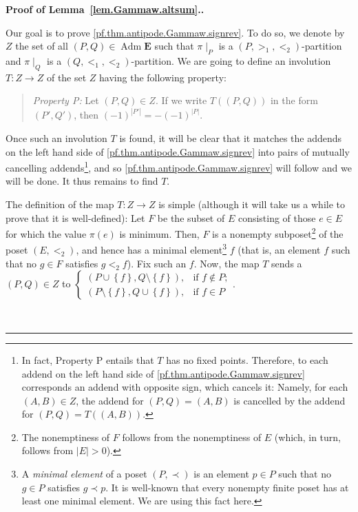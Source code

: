 \documentclass[numbers=enddot,12pt,final,onecolumn,notitlepage,abstracton]{scrartcl}%
\theoremstyle{definition}
\newenvironment{statement}{\begin{quote}}{\end{quote}}
\newenvironment{proof}[1][Proof]{\noindent\textbf{#1.} }{\ \rule{0.5em}{0.5em}}
\newcommand{\Adm}{\operatorname{Adm}}
\newcommand{\EE}{{\mathbf{E}}}
\begin{document}
\begin{proof}[Proof of Lemma~\ref{lem.Gammaw.altsum}.]

Our goal is to prove \eqref{pf.thm.antipode.Gammaw.signrev}.
To do so, we denote by $Z$ the set of all
$\left(P, Q\right) \in \Adm \EE$ such that
$\pi\mid_P$ is a $\left(P, >_1, <_2\right)$-partition and
$\pi\mid_Q$ is a $\left(Q, <_1, <_2\right)$-partition. We are going
to define an involution $T : Z \to Z$ of the set $Z$ having the
following property:
\begin{statement}
\textit{Property P:} Let $\left(P, Q\right) \in Z$. If we write
$T\left(\left(P, Q\right)\right)$ in the form
$\left(P', Q'\right)$, then
$\left(-1\right)^{\left|P'\right|}
= - \left(-1\right)^{\left|P\right|}$.
\end{statement}
Once such an involution $T$
is found, it will be clear that it matches the addends on the left
hand side of \eqref{pf.thm.antipode.Gammaw.signrev} into pairs of
mutually cancelling addends\footnote{In fact, Property P
entails that $T$ has no fixed points. Therefore, to each addend
on the left
hand side of \eqref{pf.thm.antipode.Gammaw.signrev} corresponds an
addend with opposite sign, which cancels it: Namely, for each
$\left(A, B\right) \in Z$, the addend for
$\left(P, Q\right) = \left(A, B\right)$ is cancelled by the addend
for $\left(P, Q\right) = T\left(\left(A, B\right)\right)$.}, and so
\eqref{pf.thm.antipode.Gammaw.signrev}
will follow and we will be done. It thus remains to find $T$.


The definition of the map $T : Z \to Z$
is simple (although it will take us a while to prove
that it is well-defined): Let $F$ be the subset of $E$ consisting of those
$e\in E$ for which the value $\pi \left( e \right)$ is minimum.
Then, $F$ is a nonempty
subposet\footnote{The nonemptiness of $F$ follows from the nonemptiness
of $E$ (which, in turn, follows from $\left|E\right| > 0$).}
of the poset $\left(  E,<_{2}\right)  $, and hence has a minimal
element\footnote{A \textit{minimal element} of a poset
$\left(P, \prec\right)$ is an element $p \in P$ such that no
$g \in P$ satisfies $g \prec p$. It is well-known that every nonempty
finite poset has at least one minimal element. We are using this fact
here.}
$f$ (that is, an element $f$ such that no $g\in F$ satisfies $g<_{2}
f$). Fix such an $f$. Now, the map $T$ sends a $\left(  P,Q\right)  \in Z$ to
$
\begin{cases}
\left(  P\cup\left\{  f\right\}  ,Q\setminus\left\{  f\right\}  \right)  , &
\text{if }f\notin P;\\
\left(  P\setminus\left\{  f\right\}  ,Q\cup\left\{  f\right\}  \right)  , &
\text{if }f\in P
\end{cases}
$.


\end{proof}
\end{document}
